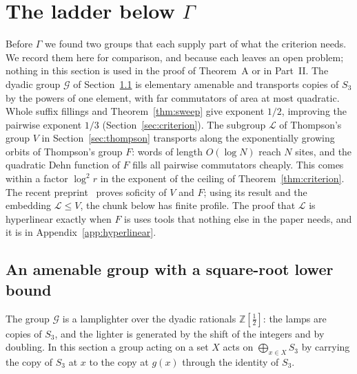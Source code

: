 \section{The ladder below \texorpdfstring{$\Gamma$}{Gamma}}\label{sec:ladder}

Before $\Gamma$ we found two groups that each supply part of what the criterion needs. We record them here for comparison, and because each
leaves an open problem; nothing in this section is used in the proof of Theorem~A or in Part~II. The dyadic group $\mathcal G$ of
Section~\ref{sec:dyadic} is elementary amenable and transports copies of $S_3$ by the powers of one element, with far commutators of area at most
quadratic. Whole suffix fillings and Theorem~\ref{thm:sweep} give exponent $1/2$, improving the pairwise exponent $1/3$
(Section~\ref{sec:criterion}). The subgroup $\mathcal L$ of Thompson's group $V$ in Section~\ref{sec:thompson}
transports along the exponentially growing orbits of Thompson's group $F$:
words of length $O(\log N)$ reach $N$ sites, and the quadratic Dehn function
of $F$ fills all pairwise commutators cheaply. This comes within a factor
$\log^2 r$ in the exponent of the ceiling of Theorem~\ref{thm:criterion}.
The recent preprint~\cite[Theorem~1.1 and Corollary~1.2]{CJM2026} proves
soficity of $V$ and $F$; using its result and the embedding
$\mathcal L\le V$, the chunk below has finite profile.
The proof that $\mathcal L$ is hyperlinear exactly when $F$ is uses tools that nothing else in the paper
needs, and it is in Appendix~\ref{app:hyperlinear}.

\subsection{An amenable group with a square-root lower bound}\label{sec:dyadic}

The group $\mathcal G$ is a lamplighter over the dyadic rationals $\mathbb Z[\frac12]$: the lamps are copies of $S_3$, and the lighter is
generated by the shift of the integers and by doubling. In this section a group acting on a set $X$ acts on $\bigoplus_{x\in X}S_3$ by carrying
the copy of $S_3$ at $x$ to the copy at $g(x)$ through the identity of $S_3$.


